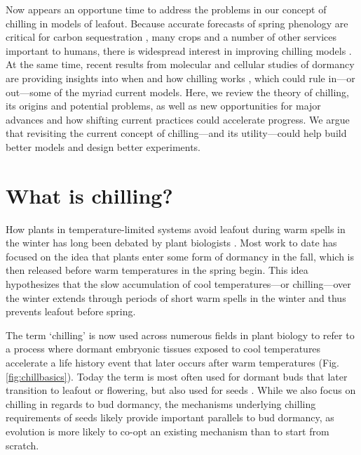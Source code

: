 \documentclass[11pt]{article}
\begin{document}
Now appears an opportune time to address the problems in our concept of chilling in models of leafout. Because accurate forecasts of spring phenology are critical for carbon sequestration \citep{green2022limits,keenan2014net}, many crops and a number of other services important to humans, there is widespread interest in improving chilling models \citep{Luedeling2015Acta,chuine2016}. At the same time, recent results from molecular and cellular studies of dormancy are providing insights into when and how chilling works \citep{pan2023epigenetic,zhu2021cold}, which could rule in---or out---some of the myriad current models. %
Here, we review the theory of chilling, its origins and potential problems, as well as new opportunities for major advances and how shifting current practices could accelerate progress. We argue that revisiting the current concept of chilling---and its utility---could help build better models and design better experiments. %

\section*{What is chilling?}

How plants in temperature-limited systems avoid leafout during warm spells in the winter has long been debated by plant biologists \citep[e.g.,][]{lamb1948effect,weinberger}. Most work to date has focused on the idea that plants enter some form of dormancy in the fall, which is then released before warm temperatures in the spring begin. This idea hypothesizes that the slow accumulation of cool temperatures---or chilling---over the winter extends through periods of short warm spells in the winter and thus prevents leafout before spring. 

The term `chilling' is now used across numerous fields in plant biology to refer to a process where dormant embryonic tissues exposed to cool temperatures accelerate a life history event that later occurs after warm temperatures (Fig. \ref{fig:chillbasics}). Today the term is most often used for dormant buds that later transition to leafout or flowering, but also used for seeds \citep[though `cold stratification,' which indicates an additional requirement of moist conditions, is more often used for seeds,][]{baskin2000seeds,considine2016language}. While we also focus on chilling in regards to bud dormancy, the mechanisms underlying chilling requirements of seeds likely provide important parallels to bud dormancy, as evolution is more likely to co-opt an existing mechanism than to start from scratch.  %
\end{document}

